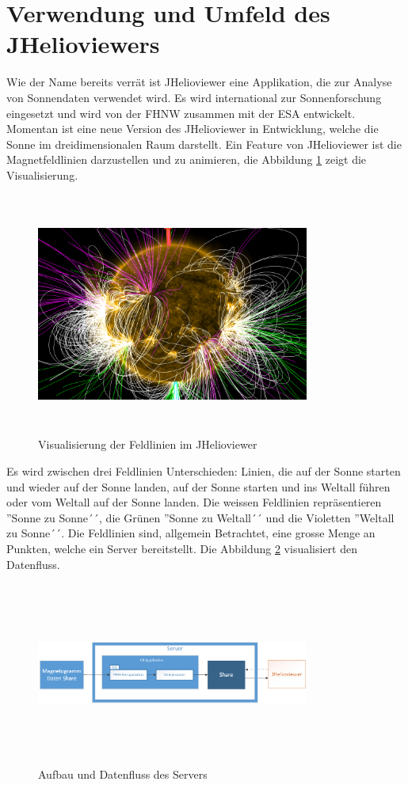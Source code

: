 \section{Verwendung und Umfeld des JHelioviewers}
Wie der Name bereits verrät ist JHelioviewer eine Applikation,  die zur Analyse von Sonnendaten verwendet wird. Es wird international zur Sonnenforschung eingesetzt und wird von der FHNW zusammen mit der ESA entwickelt. Momentan ist eine neue Version des JHelioviewer in Entwicklung, welche die Sonne im dreidimensionalen Raum darstellt. Ein Feature von JHelioviewer ist die Magnetfeldlinien darzustellen und zu animieren, die Abbildung \ref{einleitung::feldlinien} zeigt die Visualisierung.
\begin{figure}[!htbp]
\center
	\includegraphics[width=0.8\textwidth,height=8cm,keepaspectratio]{./pictures/einleitung/fieldLines.png}
	\caption{Visualisierung der Feldlinien im JHelioviewer}
	\label{einleitung::feldlinien}
\end{figure}
Es wird zwischen drei Feldlinien Unterschieden: Linien, die auf der Sonne starten und wieder auf der Sonne landen, auf der Sonne starten und ins Weltall führen oder vom Weltall auf der Sonne landen. Die weissen Feldlinien repräsentieren ''Sonne zu Sonne´´, die Grünen ''Sonne zu Weltall´´ und die Violetten ''Weltall zu Sonne´´. Die Feldlinien sind, allgemein Betrachtet, eine grosse Menge an Punkten, welche ein Server bereitstellt. Die Abbildung \ref{einleitung::aufbau} visualisiert den Datenfluss.
\begin{figure}[!htbp]
\center
	\includegraphics[width=0.8\textwidth,height=6cm,keepaspectratio]{./pictures/einleitung/server.png}
	\caption{Aufbau und Datenfluss des Servers}
	\label{einleitung::aufbau}
\end{figure}
